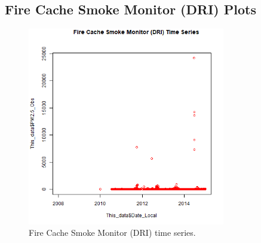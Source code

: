 
\subsection*{Fire Cache Smoke Monitor (DRI) Plots}
\begin{figure} 
\centering 
\includegraphics[width=0.77\textwidth]{Code_Outputs/FireCacheDRI_time_series.png} 
\caption{\label{fig:FireCacheDRITS}Fire Cache Smoke Monitor (DRI) time series.} 
\end{figure} 
 
